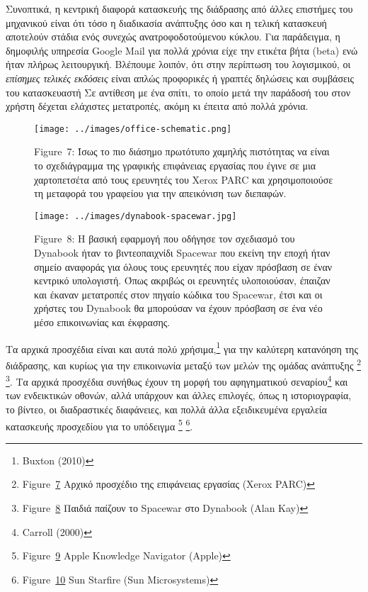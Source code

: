 \documentclass[
]{article}
\begin{document}
Συνοπτικά, η κεντρική διαφορά κατασκευής της διάδρασης από άλλες
επιστήμες του μηχανικού είναι ότι τόσο η διαδικασία ανάπτυξης όσο και η
τελική κατασκευή αποτελούν στάδια ενός συνεχώς ανατροφοδοτούμενου
κύκλου. Για παράδειγμα, η δημοφιλής υπηρεσία Google Mail για πολλά
χρόνια είχε την ετικέτα βήτα (beta) ενώ ήταν πλήρως λειτουργική.
Βλέπουμε λοιπόν, ότι στην περίπτωση του λογισμικού, οι \emph{επίσημες
τελικές εκδόσεις} είναι απλώς προφορικές ή γραπτές δηλώσεις και
συμβάσεις του κατασκευαστή Σε αντίθεση με ένα σπίτι, το οποίο μετά την
παράδοσή του στον χρήστη δέχεται ελάχιστες μετατροπές, ακόμη κι έπειτα
από πολλά χρόνια.

\leavevmode{}%
\begin{figure}
\hypertarget{fig:office-schematic}{%
\centering
\texttt{[image: ../images/office-schematic.png]}
\caption{Figure~7: Ίσως το πιο διάσημο πρωτότυπο χαμηλής πιστότητας να
είναι το σχεδιάγραμμα της γραφικής επιφάνειας εργασίας που έγινε σε μια
χαρτοπετσέτα από τους ερευνητές του Xerox PARC και χρησιμοποιούσε τη
μεταφορά του γραφείου για την απεικόνιση των
διεπαφών.}\label{fig:office-schematic}
}
\end{figure}

\leavevmode{}%
\begin{figure}
\hypertarget{fig:dynabook-spacewar}{%
\centering
\texttt{[image: ../images/dynabook-spacewar.jpg]}
\caption{Figure~8: Η βασική εφαρμογή που οδήγησε τον σχεδιασμό του
Dynabook ήταν το βιντεοπαιχνίδι Spacewar που εκείνη την εποχή ήταν
σημείο αναφοράς για όλους τους ερευνητές που είχαν πρόσβαση σε έναν
κεντρικό υπολογιστή. Όπως ακριβώς οι ερευνητές υλοποιούσαν, έπαιζαν και
έκαναν μετατροπές στον πηγαίο κώδικα του Spacewar, έτσι και οι χρήστες
του Dynabook θα μπορούσαν να έχουν πρόσβαση σε ένα νέο μέσο επικοινωνίας
και έκφρασης.}\label{fig:dynabook-spacewar}
}
\end{figure}

Τα αρχικά προσχέδια είναι και αυτά πολύ χρήσιμα,\footnote{Buxton (2010)}
για την καλύτερη κατανόηση της διάδρασης, και κυρίως για την επικοινωνία
μεταξύ των μελών της ομάδας ανάπτυξης \footnote{Figure~\protect\hyperlink{fig:office-schematic}{7}
  Αρχικό προσχέδιο της επιφάνειας εργασίας (Xerox PARC)} \footnote{Figure~\protect\hyperlink{fig:dynabook-spacewar}{8}
  Παιδιά παίζουν το Spacewar στο Dynabook (Alan Kay)}. Τα αρχικά
προσχέδια συνήθως έχουν τη μορφή του αφηγηματικού σεναρίου\footnote{Carroll
  (2000)} και των ενδεικτικών οθονών, αλλά υπάρχουν και άλλες επιλογές,
όπως η ιστοριογραφία, το βίντεο, οι διαδραστικές διαφάνειες, και πολλά
άλλα εξειδικευμένα εργαλεία κατασκευής προσχεδίου για το υπόδειγμα
\footnote{Figure~\protect\hyperlink{fig:knowledge-navigator}{9} Apple
  Knowledge Navigator (Apple)} \footnote{Figure~\protect\hyperlink{fig:starfire-video}{10}
  Sun Starfire (Sun Microsystems)}.
\end{document}

